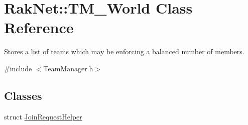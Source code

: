 \hypertarget{class_rak_net_1_1_t_m___world}{\section{Rak\-Net\-:\-:T\-M\-\_\-\-World Class Reference}
\label{class_rak_net_1_1_t_m___world}
}


Stores a list of teams which may be enforcing a balanced number of members.  




{\ttfamily \#include $<$Team\-Manager.\-h$>$}

\subsection*{Classes}
\begin{DoxyCompactItemize}
\item 
struct \hyperlink{struct_rak_net_1_1_t_m___world_1_1_join_request_helper}{Join\-Request\-Helper}
\end{DoxyCompactItemize}
